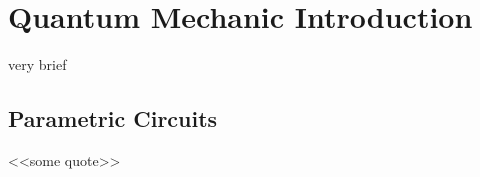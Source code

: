 \documentclass[headsepline,footsepline,footinclude=false,oneside,fontsize=11pt,paper=a4,listof=totoc,bibliography=totoc,DIV=12]{scrbook} %
\begin{document}
\chapter{Quantum Mechanic Introduction}\label{chapter:quantum_mechanic_introduction}
very brief
\section{Parametric Circuits}

<<some quote>>
  

\end{document}
